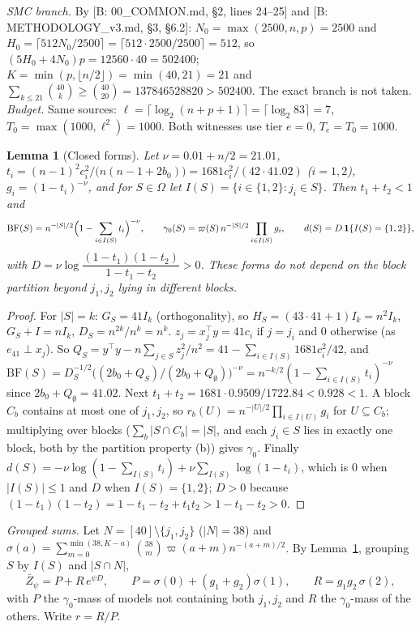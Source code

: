 \documentclass[11pt]{article}
\newtheorem{lemma}{Lemma}
\theoremstyle{remark}
\newcommand{\Zb}{\bar Z}
\begin{document}
\emph{SMC branch.} By [B: 00\_COMMON.md, \S2, lines 24--25] and [B: METHODOLOGY\_v3.md, \S3, \S6.2]: $N_0=\max(2500,n,p)=2500$ and $H_0=\lceil512N_0/2500\rceil=\lceil512\cdot2500/2500\rceil=512$, so $(5H_0+4N_0)p=12560\cdot40=502400$; $K=\min(p,\lfloor n/2\rfloor)=\min(40,21)=21$ and $\sum_{k\le21}\binom{40}k\ge\binom{40}{20}=137846528820>502400$. The exact branch is not taken.
\emph{Budget.} Same sources: $\ell=\lceil\log_2(n+p+1)\rceil=\lceil\log_2 83\rceil=7$, $T_0=\max(1000,\ell^2)=1000$. Both witnesses use tier $e=0$, $T_e=T_0=1000$.

\begin{lemma}[Closed forms]\label{lem:cf}
Let $\nu=0.01+n/2=21.01$, $t_i=(n-1)^2c_i^2/\bigl(n(n-1+2b_0)\bigr)=1681c_i^2/(42\cdot41.02)$ ($i=1,2$), $g_i=(1-t_i)^{-\nu}$, and for $S\in\Omega$ let $I(S)=\{i\in\{1,2\}:j_i\in S\}$. Then $t_1+t_2<1$ and
\[
\mathrm{BF}(S)=n^{-|S|/2}\Bigl(1-\sum_{i\in I(S)}t_i\Bigr)^{-\nu},\qquad
\gamma_0(S)=\varpi(S)\,n^{-|S|/2}\prod_{i\in I(S)}g_i,\qquad
d(S)=D\,\mathbf 1\{I(S)=\{1,2\}\},
\]
with $D=\nu\log\dfrac{(1-t_1)(1-t_2)}{1-t_1-t_2}>0$. These forms do not depend on the block partition beyond $j_1,j_2$ lying in different blocks.
\end{lemma}
\begin{proof}
For $|S|=k$: $G_S=41I_k$ (orthogonality), so $H_S=(43\cdot41+1)I_k=n^2I_k$, $G_S+I=nI_k$, $D_S=n^{2k}/n^k=n^k$. $z_j=x_j^\top y=41c_i$ if $j=j_i$ and $0$ otherwise (as $e_{41}\perp x_j$). So $Q_S=y^\top y-n\sum_{j\in S}z_j^2/n^2=41-\sum_{i\in I(S)}1681c_i^2/42$, and
$\mathrm{BF}(S)=D_S^{-1/2}\bigl((2b_0+Q_S)/(2b_0+Q_\emptyset)\bigr)^{-\nu}=n^{-k/2}(1-\sum_{i\in I(S)}t_i)^{-\nu}$ since $2b_0+Q_\emptyset=41.02$. Next $t_1+t_2=1681\cdot0.9509/1722.84<0.928<1$. A block $C_b$ contains at most one of $j_1,j_2$, so $r_b(U)=n^{-|U|/2}\prod_{i\in I(U)}g_i$ for $U\subseteq C_b$; multiplying over blocks ($\sum_b|S\cap C_b|=|S|$, and each $j_i\in S$ lies in exactly one block, both by the partition property (b)) gives $\gamma_0$. Finally $d(S)=-\nu\log(1-\sum_{I(S)}t_i)+\nu\sum_{I(S)}\log(1-t_i)$, which is $0$ when $|I(S)|\le1$ and $D$ when $I(S)=\{1,2\}$; $D>0$ because $(1-t_1)(1-t_2)=1-t_1-t_2+t_1t_2>1-t_1-t_2>0$.
\end{proof}

\emph{Grouped sums.} Let $N=[40]\setminus\{j_1,j_2\}$ ($|N|=38$) and $\sigma(a)=\sum_{m=0}^{\min(38,K-a)}\binom{38}{m}\varpi(a+m)n^{-(a+m)/2}$. By Lemma~\ref{lem:cf}, grouping $S$ by $I(S)$ and $|S\cap N|$,
\[
\Zb_\psi=P+R\,e^{\psi D},\qquad P=\sigma(0)+(g_1+g_2)\sigma(1),\qquad R=g_1g_2\,\sigma(2),
\]
with $P$ the $\gamma_0$-mass of models not containing both $j_1,j_2$ and $R$ the $\gamma_0$-mass of the others. Write $r=R/P$.
\end{document}
